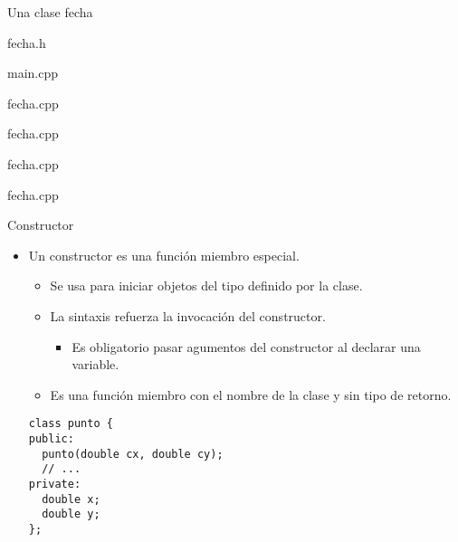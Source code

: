 \begin{frame}{Una clase fecha}
\begin{block}{fecha.h}

\end{block}
\end{frame}

\begin{frame}
\begin{block}{main.cpp}

\end{block}
\end{frame}

\begin{frame}
\begin{block}{fecha.cpp}

\end{block}
\end{frame}

\begin{frame}
\begin{block}{fecha.cpp}

\end{block}
\end{frame}

\begin{frame}
\begin{block}{fecha.cpp}

\end{block}
\end{frame}

\begin{frame}
\begin{block}{fecha.cpp}

\end{block}
\end{frame}

\begin{frame}[fragile]{Constructor}
\begin{itemize}
  \item Un \alert{constructor} es una función miembro especial.
    \begin{itemize}
      \item Se usa para iniciar objetos del tipo definido por la clase.
      \item La sintaxis refuerza la invocación del constructor.
        \begin{itemize}
          \item Es obligatorio pasar agumentos del constructor al declarar una variable.
        \end{itemize}
      \item Es una función miembro con el nombre de la clase y sin tipo de retorno.
    \end{itemize}
\begin{lstlisting}
class punto {
public:
  punto(double cx, double cy);
  // ...
private:
  double x;
  double y;
};
\end{lstlisting}
\end{itemize}
\end{frame}

